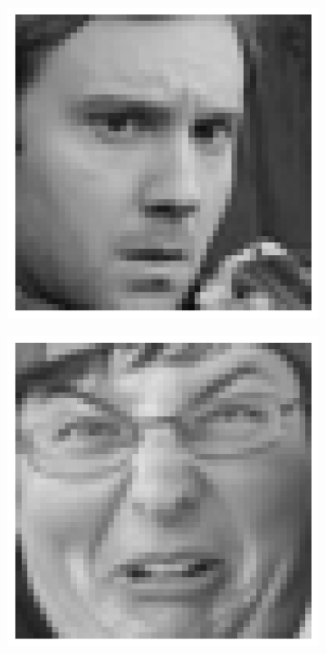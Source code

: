 \documentclass{article}
\begin{document}
\begin{figure}
  \begin{subfigure}{0.1\textwidth}
    \centering
    \includegraphics[width=\textwidth]{"angry"}
  \end{subfigure}
  \begin{subfigure}{0.1\textwidth}
    \centering
    \includegraphics[width=\textwidth]{"disgust"}

\end{subfigure}
\end{figure}
\end{document}
